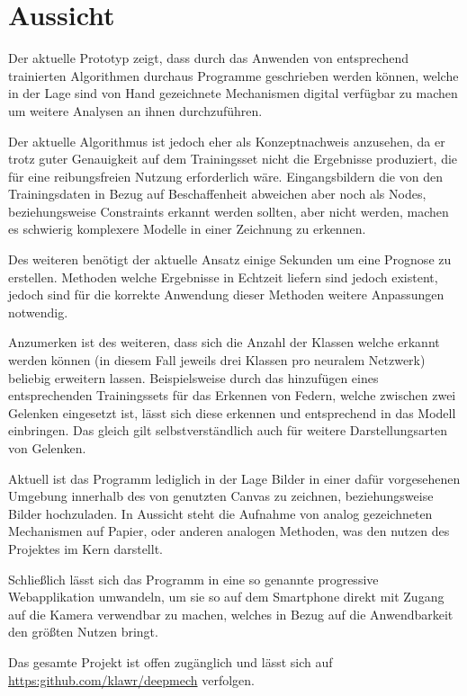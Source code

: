 \section{Aussicht}
Der aktuelle Prototyp zeigt, dass durch das Anwenden von entsprechend trainierten Algorithmen durchaus Programme geschrieben werden können, welche in der Lage sind von Hand gezeichnete Mechanismen digital verfügbar zu machen um weitere Analysen an ihnen durchzuführen.

Der aktuelle Algorithmus ist jedoch eher als Konzeptnachweis anzusehen, da er trotz guter Genauigkeit auf dem Trainingsset nicht die Ergebnisse produziert, die für eine reibungsfreien Nutzung erforderlich wäre.
Eingangsbildern die von den Trainingsdaten in Bezug auf Beschaffenheit abweichen aber noch als Nodes, beziehungsweise Constraints erkannt werden sollten, aber nicht werden, machen es schwierig komplexere Modelle in einer Zeichnung zu erkennen.

Des weiteren benötigt der aktuelle Ansatz einige Sekunden um eine Prognose zu erstellen.
Methoden welche Ergebnisse in Echtzeit liefern sind jedoch existent\cite{Redmon2015}\cite{Redmon2016}\cite{Redmon2018}, jedoch sind für die korrekte Anwendung dieser Methoden weitere Anpassungen notwendig.

Anzumerken ist des weiteren, dass sich die Anzahl der Klassen welche erkannt werden können (in diesem Fall jeweils drei Klassen pro neuralem Netzwerk) beliebig erweitern lassen.
Beispielsweise durch das hinzufügen eines entsprechenden Trainingssets für das Erkennen von Federn, welche zwischen zwei Gelenken eingesetzt ist, lässt sich diese erkennen und entsprechend in das  Modell einbringen.
Das gleich gilt selbstverständlich auch für weitere Darstellungsarten von Gelenken.

Aktuell ist das Programm lediglich in der Lage Bilder in einer dafür vorgesehenen Umgebung innerhalb des von  genutzten Canvas zu zeichnen, beziehungsweise Bilder hochzuladen.
In Aussicht steht die Aufnahme von analog gezeichneten Mechanismen auf Papier, oder anderen analogen Methoden, was den nutzen des Projektes im Kern darstellt.

Schließlich lässt sich das Programm in eine so genannte progressive Webapplikation umwandeln, um sie so auf dem Smartphone direkt mit Zugang auf die Kamera verwendbar zu machen, welches in Bezug auf die Anwendbarkeit den größten Nutzen bringt.

Das gesamte Projekt ist offen zugänglich und lässt sich auf \url{https:github.com/klawr/deepmech} verfolgen.
